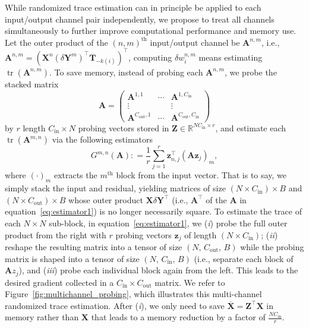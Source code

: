 \documentclass[10pt]{article}
\def\eqref#1{equation~\ref{#1}}
\newcommand{\B}{\mathbf}
\begin{document}
While randomized trace estimation can in principle be applied to each input/output channel pair independently, we propose to treat all channels simultaneously to further improve computational performance and memory use. Let the outer product of the $(n,m)^{\text{th}}$ input/output channel be $\B{A}^{n,m}$, i.e., $\B{A}^{n,m}=(\B{X}^n (\delta\B{Y}^m)^\top \B{T}_{-k(i)})^\top$, computing $\delta w_i^{n, m}$ means estimating $\operatorname{tr}(\B{A}^{n, m})$. To save memory, instead of probing each $\B{A}^{n,m}$, we probe the stacked matrix
\[
\B{A} = \left( \begin{matrix}\B{A}^{1,1} & \cdots & \B{A}^{1,C_{\text{in}}} \\ \vdots & & \vdots \\ \B{A}^{C_{\text{out}},1} & \cdots & \B{A}^{C_{\text{out}},C_{\text{in}}} \end{matrix}\right)
\]
by $r$ length $C_{\text{in}}\times N$ probing vectors stored in $\B{Z}\in \mathbb{R}^{NC_{\text{in}} \times r}$, and estimate each $\operatorname{tr}(\B{A}^{m, n})$ via the following estimators
\begin{equation}\label{eq:estimator1}
  G^{m, n}(\B{A}) : = \frac{1}{r} \sum_{j=1}^r \B{z}_{n,j}^{\top} \left(\B{A} \B{z}_j\right)_m,
\end{equation}
where $(\cdot)_m$ extracts the $m^\text{th}$ block from the input vector. That is to say, we simply stack the input and residual, yielding matrices of size $(N\times C_{\text{in}})\times B$ and $(N\times C_{\text{out}})\times B$ whose outer product $\B{X}\delta\B{Y}^\top$ (i.e., $\B{A}^\top$ of the $\B{A}$ in \eqref{eq:estimator1}) is no longer necessarily square.
To estimate the trace of each $N\times N$ sub-block, in \eqref{eq:estimator1}, we (\textit{i}) probe the full outer product from the right with $r$ probing vectors  $\B{z}_j$ of length ${(N\times C_{\text{in}})}$; (\textit{ii}) reshape the resulting matrix into a tensor of size $(N,\, C_{\text{out}},\,B)$  while the probing matrix is shaped into a tensor of size $(N,\, C_{\text{in}},\,B)$ (i.e., separate each block of $\B{A}z_j$), and  (\textit{iii}) probe each individual block again from the left. This leads to the desired gradient collected in a $C_{\text{in}} \times C_{\text{out}}$ matrix. We refer to Figure~\ref{fig:multichannel_probing}, which illustrates this multi-channel randomized trace estimation. After (\textit{i}), we only need to save $\B{\overline{X}}=\B{Z}^\top\B{X}$ in memory rather than $\B{X}$ that leads to a memory reduction by a factor of $\frac{N C_{\text{in}}}{r}$.
\end{document}
